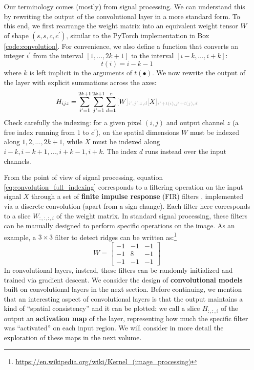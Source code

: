 \addteacup Our terminology comes (mostly) from signal processing. We can understand this by rewriting the output of the convolutional layer in a more standard form. To this end, we first rearrange the weight matrix into an equivalent weight tensor $W$ of shape $(s,s,c,c^\prime)$, similar to the PyTorch implementation in Box \ref{code:convolution}. For convenience, we also define a function that converts an integer $i^\prime$ from the interval $\left[1, \ldots, 2k+1\right]$ to the interval $\left[ i - k, \ldots, i + k\right]$:
%
\begin{equation}
t(i) = i - k - 1
\label{eq:convolutive_offset}
\end{equation}
%
where $k$ is left implicit in the arguments of $t(\bullet)$. We now rewrite the output of the layer with explicit summations across the axes:
%
\begin{equation}
H_{ijz} = \sum_{i^\prime=1}^{2k+1}\sum_{j^\prime = 1}^{2k+1}\sum_{d=1}^{c} \idx{W}{i^\prime, j^\prime, z, d}\idx{X}{i^\prime+t(i),j^\prime+t(j), d}
\label{eq:convolution_full_indexing}
\end{equation}
%
Check carefully the indexing: for a given pixel $(i,j)$ and output channel $z$ (a free index running from $1$ to $c^\prime$), on the spatial dimensions $W$ must be indexed along $1, 2, \ldots, 2k+1$, while $X$ must be indexed along $i-k, i-k+1, \ldots, i+k-1,i+k$. The index $d$ runs instead over the input channels.

From the point of view of signal processing, equation \eqref{eq:convolution_full_indexing} corresponds to a filtering operation on the input signal $X$ through a set of \textbf{finite impulse response} (FIR) filters \cite{uncini2015fundamentals}, implemented via a discrete convolution (apart from a sign change). Each filter here corresponds to a slice $W_{:,:,:,i}$ of the weight matrix. In standard signal processing, these filters can be manually designed to perform specific operations on the image. As an example, a $3 \times 3$ filter to detect ridges can be written as:\footnote{\url{https://en.wikipedia.org/wiki/Kernel_(image_processing)}}
%
$$
W =\begin{bmatrix}-1&-1&-1\\-1&8&-1\\-1&-1&-1\end{bmatrix}
$$
%
In convolutional layers, instead, these filters can be randomly initialized and trained via gradient descent. We consider the design of \textbf{convolutional models} built on convolutional layers in the next section. Before continuing, we mention that an interesting aspect of convolutional layers is that the output maintains a kind of “spatial consistency” and it can be plotted: we call a slice $H_{:,:,i}$ of the output an \textbf{activation map} of the layer, representing how much the specific filter was “activated” on each input region. We will consider in more detail the exploration of these maps in the next volume.

